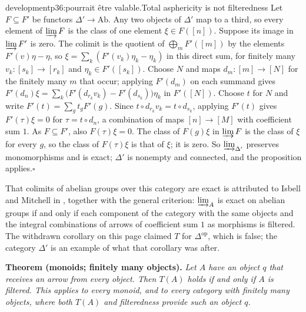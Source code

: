 \begin{dcomment}{development}{p36:pourrait être valable.}{Total asphericity is not filteredness}
Let $F\subseteq F'$ be functors $\Delta'\to\mathrm{Ab}$. Any two objects of $\Delta'$ map to a third, so every element of $\varinjlim F$ is the class of one element $\xi\in F([n])$. Suppose its image in $\varinjlim F'$ is zero. The colimit is the quotient of $\bigoplus_mF'([m])$ by the elements $F'(v)\eta-\eta$, so $\xi=\sum_k(F'(v_k)\eta_k-\eta_k)$ in this direct sum, for finitely many $v_k:[s_k]\to[r_k]$ and $\eta_k\in F'([s_k])$. Choose $N$ and maps $d_m:[m]\to[N]$ for the finitely many $m$ that occur; applying $F'(d_m)$ on each summand gives $F'(d_n)\xi=\sum_k\bigl(F'(d_{r_k}v_k)-F'(d_{s_k})\bigr)\eta_k$ in $F'([N])$. Choose $t$ for $N$ and write $F'(t)=\sum_gt_gF'(g)$. Since $t\circ d_{r_k}v_k=t\circ d_{s_k}$, applying $F'(t)$ gives $F'(\tau)\xi=0$ for $\tau=t\circ d_n$, a combination of maps $[n]\to[M]$ with coefficient sum $1$. As $F\subseteq F'$, also $F(\tau)\xi=0$. The class of $F(g)\xi$ in $\varinjlim F$ is the class of $\xi$ for every $g$, so the class of $F(\tau)\xi$ is that of $\xi$; it is zero. So $\varinjlim_{\Delta'}$ preserves monomorphisms and is exact; $\Delta'$ is nonempty and connected, and the proposition applies.\hfill$\square$

That colimits of abelian groups over this category are exact is attributed to Isbell and Mitchell in \citet[A.5]{AdamekKoubekReiterman1981}, together with the general criterion: $\varinjlim_A$ is exact on abelian groups if and only if each component of the category with the same objects and the integral combinations of arrows of coefficient sum $1$ as morphisms is filtered. The withdrawn corollary on this page claimed $T$ for $\Delta^{\mathrm{op}}$, which is false; the category $\Delta'$ is an example of what that corollary was after.

\textbf{Theorem (monoids; finitely many objects).}\ours
\textit{Let $A$ have an object $q$ that receives an arrow from every object. Then $T(A)$ holds if and only if $A$ is filtered. This applies to every monoid, and to every category with finitely many objects, where both $T(A)$ and filteredness provide such an object $q$.}


\end{dcomment}
